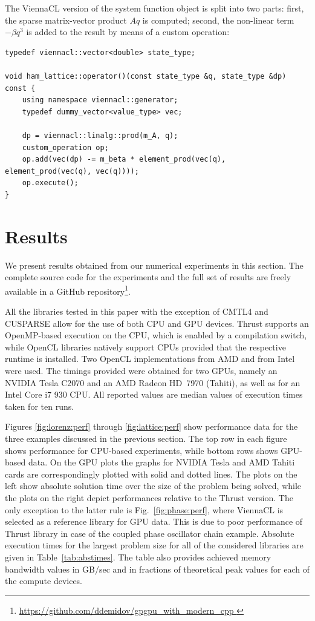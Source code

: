\documentclass[final]{siamltex}
\newcommand{\figref}[1]{Fig.~\ref{#1}}
\begin{document}
The ViennaCL version of the system function object is split into two parts:
first, the sparse matrix-vector product $Aq$ is computed; second, the
non-linear term $-\beta q^3$ is added to the result by means of a custom
operation:
\begin{lstlisting}
typedef viennacl::vector<double> state_type;

void ham_lattice::operator()(const state_type &q, state_type &dp) const {
    using namespace viennacl::generator;
    typedef dummy_vector<value_type> vec;

    dp = viennacl::linalg::prod(m_A, q);
    custom_operation op;
    op.add(vec(dp) -= m_beta * element_prod(vec(q), element_prod(vec(q), vec(q))));
    op.execute();
}
\end{lstlisting}

\section{Results} \label{sec:results}

We present results obtained from our numerical experiments in this section. The
complete source code for the experiments and the full set of results are freely
available in a GitHub repository\footnote{ \href{
https://github.com/ddemidov/gpgpu_with_modern_cpp } {
https://github.com/ddemidov/gpgpu\_with\_modern\_cpp } }.

All the libraries tested in this paper with the exception of CMTL4 and CUSPARSE
allow for the use of both CPU and GPU devices.  Thrust supports an OpenMP-based
execution on the CPU, which is enabled by a compilation switch, while OpenCL
libraries natively support CPUs provided that the respective runtime is
installed. Two OpenCL implementations from AMD and from Intel were used.  The
timings provided were obtained for two GPUs, namely an NVIDIA Tesla C2070 and
an AMD Radeon HD~7970 (Tahiti), as well as for an Intel Core i7 930 CPU. All
reported values are median values of execution times taken for ten runs.

Figures \ref{fig:lorenz:perf} through \ref{fig:lattice:perf} show performance
data for the three examples discussed in the previous section.
The top row in each figure shows performance for CPU-based
experiments, while bottom rows shows GPU-based data. On the GPU plots the
graphs for NVIDIA Tesla and AMD Tahiti cards are correspondingly plotted with
solid and dotted lines.
The plots on the left show absolute solution time over the size of the problem
being solved, while the plots on the right depict performances relative to the
Thrust version. The only exception to the latter rule is
\figref{fig:phase:perf}, where ViennaCL is selected as a reference library for
GPU data.  This is due to poor performance of Thrust library in case of the
coupled phase oscillator chain example.
Absolute execution times for the largest problem size for all of the considered
libraries are given in Table~\ref{tab:abstimes}. The table also provides
achieved memory bandwidth values in GB/sec and in fractions of theoretical peak
values for each of the compute devices.
\end{document}
